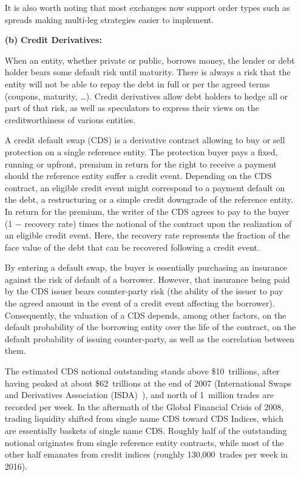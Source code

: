 \begin{enumerate}
It is also worth noting that most exchanges now support order types such as spreads making multi-leg strategies easier to implement.


\item[\textbf{(b)}] \textbf{Credit Derivatives:} 

When an entity, whether private or public, borrows money, the lender or debt holder bears some default risk until maturity. There is always a risk that the entity will not be able to repay the debt in full or per the agreed terms (coupons, maturity, \dots). Credit derivatives allow debt holders to hedge all or part of that risk, as well as speculators to express their views on the creditworthiness of various entities. 


A credit default swap (CDS) is a derivative contract allowing to buy or sell protection on a single reference entity. The protection buyer pays a fixed, running or upfront, premium in return for the right to receive a payment should the reference entity suffer a credit event. Depending on the CDS contract, an eligible credit event might correspond to a payment default on the debt, a restructuring or a simple credit downgrade of the reference entity. In return for the premium, the writer of the CDS agrees to pay to the buyer (1 $-$ recovery rate) times the notional of the contract upon the realization of an eligible credit event. Here, the recovery rate represents the fraction of the face value of the debt that can be recovered following a credit event.


By entering a default swap, the buyer is essentially purchasing an insurance against the risk of default of a borrower. However, that insurance being paid by the CDS issuer bears counter-party risk (the ability of the issuer to pay the agreed amount in the event of a credit event affecting the borrower). Consequently, the valuation of a CDS depends, among other factors, on the default probability of the borrowing entity over the life of the contract, on the default probability of issuing counter-party, as well as the correlation between them.


The estimated CDS notional outstanding stands above \$10~trillions, after having peaked at about \$62~trillions at the end of 2007 (International Swaps and Derivatives Association (ISDA)~\cite{ISDA}), and north of 1~million trades are recorded per week. In the aftermath of the Global Financial Crisis of 2008, trading liquidity shifted from single name CDS toward CDS Indices, which are essentially baskets of single name CDS. Roughly half of the outstanding notional originates from single reference entity contracts, while most of the other half emanates from credit indices (roughly 130,000~trades per week in 2016).



\end{enumerate}
